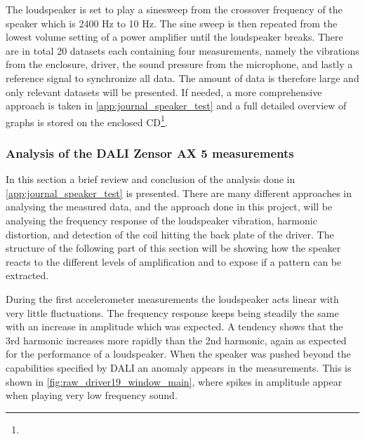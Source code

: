 The loudspeaker is set to play a sinesweep from the crossover frequency of the speaker which is 2400 Hz to 10 Hz. The sine sweep is then repeated from the lowest volume setting of a power amplifier until the loudspeaker breaks. There are in total 20 datasets each containing four measurements, namely the vibrations from the enclosure, driver, the sound pressure from the microphone, and lastly a reference signal to synchronize all data. The amount of data is therefore large and only relevant datasets will be presented. If needed, a more comprehensive approach is taken in \autoref{app:journal_speaker_test} and a full detailed overview of graphs is stored on the enclosed CD\footnote{}.



\subsubsection{Analysis of the DALI Zensor AX 5 measurements}

In this section a brief review and conclusion of the analysis done in \autoref{app:journal_speaker_test} is presented. 
There are many different approaches in analysing the measured data, and the approach done in this project, will be analysing the frequency response of the loudspeaker vibration, harmonic distortion, and detection of the coil hitting the back plate of the driver. The structure of the following part of this section will be showing how the speaker reacts to the different levels of amplification and to expose if a pattern can be extracted.




During the first accelerometer measurements the loudspeaker acts linear with very little fluctuations. The frequency response keeps being steadily the same with an increase in amplitude which was expected. A tendency shows that the 3rd harmonic increases more rapidly than the 2nd harmonic, again as expected for the performance of a loudspeaker. When the speaker was pushed beyond the capabilities specified by DALI an anomaly appears in the measurements. This is shown in \autoref{fig:raw_driver19_window_main}, where spikes in amplitude appear when playing very low frequency sound. 

